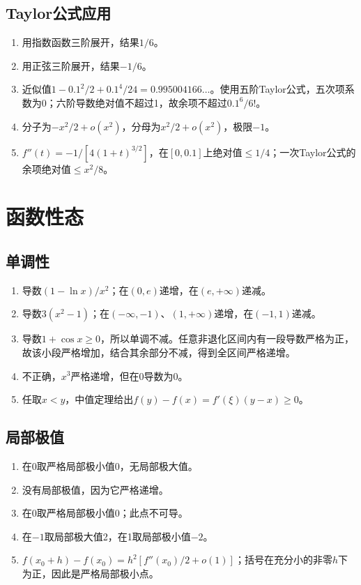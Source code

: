 \documentclass[11pt,a4paper,fontset=fandol]{ctexrep}
\begin{document}
\subsection{Taylor公式应用}
\begin{enumerate}
\item 用指数函数三阶展开，结果$1/6$。
\item 用正弦三阶展开，结果$-1/6$。
\item 近似值$1-0.1^2/2+0.1^4/24=0.995004166\ldots$。使用五阶Taylor公式，五次项系数为0；六阶导数绝对值不超过1，故余项不超过$0.1^6/6!$。
\item 分子为$-x^2/2+o(x^2)$，分母为$x^2/2+o(x^2)$，极限$-1$。
\item $f''(t)=-1/[4(1+t)^{3/2}]$，在$[0,0.1]$上绝对值$\le1/4$；一次Taylor公式的余项绝对值$\le x^2/8$。
\end{enumerate}
\section{函数性态}
\subsection{单调性}
\begin{enumerate}
\item 导数$(1-\ln x)/x^2$；在$(0,e)$递增，在$(e,+\infty)$递减。
\item 导数$3(x^2-1)$；在$(-\infty,-1)$、$(1,+\infty)$递增，在$(-1,1)$递减。
\item 导数$1+\cos x\ge0$，所以单调不减。任意非退化区间内有一段导数严格为正，故该小段严格增加，结合其余部分不减，得到全区间严格递增。
\item 不正确，$x^3$严格递增，但在0导数为0。
\item 任取$x<y$，中值定理给出$f(y)-f(x)=f'(\xi)(y-x)\ge0$。
\end{enumerate}
\subsection{局部极值}
\begin{enumerate}
\item 在0取严格局部极小值0，无局部极大值。
\item 没有局部极值，因为它严格递增。
\item 在0取严格局部极小值0；此点不可导。
\item 在$-1$取局部极大值2，在1取局部极小值$-2$。
\item $f(x_0+h)-f(x_0)=h^2[f''(x_0)/2+o(1)]$；括号在充分小的非零$h$下为正，因此是严格局部极小点。
\end{enumerate}
\end{document}
